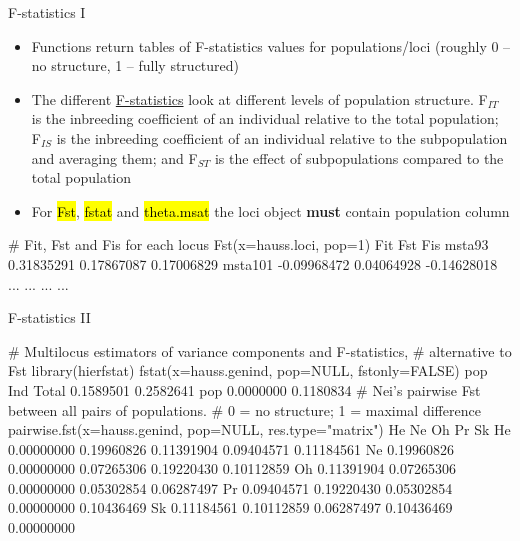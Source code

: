 \documentclass[compress, ucs, xelatex, 11pt, xcolor=svgnames,
  hyperref={
    bookmarks=true,
    unicode=true,
    colorlinks=true,
    pdftitle={Molecular data in R},
    plainpages=false,
    pdfauthor={Vojtech Zeisek},
    pdfsubject={Course about phylogeny and evolution in R},
    pdfcreator={XeLaTeX},
    pdfkeywords={R, evolution, phylogeny, molecular data},
    linkcolor=Tomato,
    anchorcolor=SaddleBrown,
    citecolor=Goldenrod,
    filecolor=DarkMagenta,
    menucolor=Sienna,
    urlcolor=DarkTurquoise,
    pdftex},
  url={hyphens, lowtilde} %
  ]{beamer}
\renewcommand{\texttt}[1]{\hl{\ttfamily #1}}
\begin{document}
\begin{frame}[fragile]{F-statistics I}
  \begin{itemize}
    \item Functions return tables of F-statistics values for populations/loci (roughly 0 -- no structure, 1 -- fully structured)
    \item The different \href{https://en.wikipedia.org/wiki/F-statistics}{F-statistics} look at different levels of population structure. F$_{IT}$ is the inbreeding coefficient of an individual relative to the total population; F$_{IS}$ is the inbreeding coefficient of an individual relative to the subpopulation and averaging them; and F$_{ST}$ is the effect of subpopulations compared to the total population
    \item For \texttt{Fst}, \texttt{fstat} and \texttt{theta.msat} the loci object \textbf{must} contain population column
  \end{itemize}
  \begin{spluscode}
    # Fit, Fst and Fis for each locus
    Fst(x=hauss.loci, pop=1)
                    Fit        Fst         Fis
    msta93   0.31835291 0.17867087  0.17006829
    msta101 -0.09968472 0.04064928 -0.14628018
        ...         ...        ...         ...
  \end{spluscode}
\end{frame}

\begin{frame}[fragile]{F-statistics II}
  \begin{spluscode}
    # Multilocus estimators of variance components and F-statistics,
    # alternative to Fst
    library(hierfstat)
    fstat(x=hauss.genind, pop=NULL, fstonly=FALSE)
                pop       Ind
    Total 0.1589501 0.2582641
    pop   0.0000000 0.1180834
    # Nei's pairwise Fst between all pairs of populations.
    # 0 = no structure; 1 = maximal difference
    pairwise.fst(x=hauss.genind, pop=NULL, res.type="matrix")
               He         Ne         Oh         Pr         Sk
    He 0.00000000 0.19960826 0.11391904 0.09404571 0.11184561
    Ne 0.19960826 0.00000000 0.07265306 0.19220430 0.10112859
    Oh 0.11391904 0.07265306 0.00000000 0.05302854 0.06287497
    Pr 0.09404571 0.19220430 0.05302854 0.00000000 0.10436469
    Sk 0.11184561 0.10112859 0.06287497 0.10436469 0.00000000
  \end{spluscode}
\end{frame}

\end{document}
